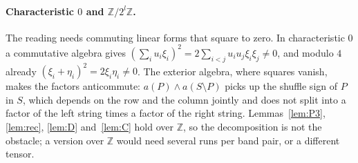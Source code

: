 \documentclass[11pt]{article}
\theoremstyle{definition}
\theoremstyle{remark}
\newcommand{\Z}{\mathbb{Z}}
\begin{document}
\paragraph{Characteristic $0$ and $\Z/2^l\Z$.} The reading needs commuting linear forms that square to zero. In characteristic $0$ a commutative algebra gives $(\sum_iu_i\xi_i)^2=2\sum_{i<j}u_iu_j\xi_i\xi_j\ne0$, and modulo $4$ already $(\xi_i+\eta_i)^2=2\xi_i\eta_i\ne0$. The exterior algebra, where squares vanish, makes the factors anticommute: $a(P)\wedge a(S\setminus P)$ picks up the shuffle sign of $P$ in $S$, which depends on the row and the column jointly and does not split into a factor of the left string times a factor of the right string. Lemmas~\ref{lem:P3}, \ref{lem:rec}, \ref{lem:D} and~\ref{lem:C} hold over $\Z$, so the decomposition is not the obstacle; a version over $\Z$ would need several runs per band pair, or a different tensor.
\end{document}
